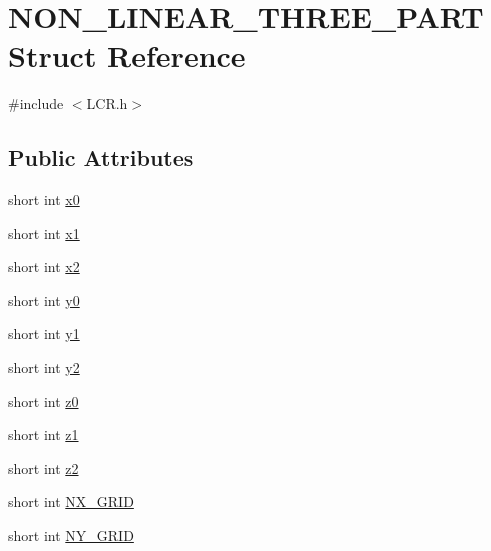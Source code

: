 \hypertarget{struct_n_o_n___l_i_n_e_a_r___t_h_r_e_e___p_a_r_t}{\section{N\-O\-N\-\_\-\-L\-I\-N\-E\-A\-R\-\_\-\-T\-H\-R\-E\-E\-\_\-\-P\-A\-R\-T Struct Reference}
\label{struct_n_o_n___l_i_n_e_a_r___t_h_r_e_e___p_a_r_t}
}


{\ttfamily \#include $<$L\-C\-R.\-h$>$}

\subsection*{Public Attributes}
\begin{DoxyCompactItemize}
\item 
short int \hyperlink{struct_n_o_n___l_i_n_e_a_r___t_h_r_e_e___p_a_r_t_a44c23ca5d034d7fca076640c530129de}{x0}
\item 
short int \hyperlink{struct_n_o_n___l_i_n_e_a_r___t_h_r_e_e___p_a_r_t_a47c4c5a02e0e793424051d6b422300be}{x1}
\item 
short int \hyperlink{struct_n_o_n___l_i_n_e_a_r___t_h_r_e_e___p_a_r_t_a4cda9d73d7a02642fa7b33f7b513b5b9}{x2}
\item 
short int \hyperlink{struct_n_o_n___l_i_n_e_a_r___t_h_r_e_e___p_a_r_t_a1db39824f31abb42538ce2094204332c}{y0}
\item 
short int \hyperlink{struct_n_o_n___l_i_n_e_a_r___t_h_r_e_e___p_a_r_t_a187119b8a6ef1c5faa95651a31989050}{y1}
\item 
short int \hyperlink{struct_n_o_n___l_i_n_e_a_r___t_h_r_e_e___p_a_r_t_accd1190742c5417fd094cfd43ad53041}{y2}
\item 
short int \hyperlink{struct_n_o_n___l_i_n_e_a_r___t_h_r_e_e___p_a_r_t_afa636122297a565bedcfa6ce0824e332}{z0}
\item 
short int \hyperlink{struct_n_o_n___l_i_n_e_a_r___t_h_r_e_e___p_a_r_t_a2b503fe71f5ca57b33c16a0d6fe81a3d}{z1}
\item 
short int \hyperlink{struct_n_o_n___l_i_n_e_a_r___t_h_r_e_e___p_a_r_t_aa6e32f9eaad5920d7dfb6826f9a79366}{z2}
\item 
short int \hyperlink{struct_n_o_n___l_i_n_e_a_r___t_h_r_e_e___p_a_r_t_a37f0eaf34aef06d521d51baf9277e832}{N\-X\-\_\-\-G\-R\-I\-D}
\item 
short int \hyperlink{struct_n_o_n___l_i_n_e_a_r___t_h_r_e_e___p_a_r_t_aa5f80f2cb2649fa5090e9be5347260ea}{N\-Y\-\_\-\-G\-R\-I\-D}

\end{DoxyCompactItemize}
